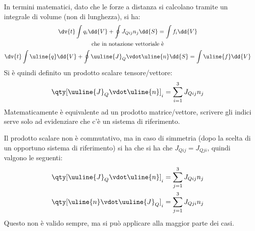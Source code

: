 In termini matematici, dato che le forze a distanza si calcolano tramite un integrale di volume (non di lunghezza), si ha:
	\begin{equation*}
		\begin{gathered}
			\dv{t} \int{q_i \dd{V}} + \oint{J_{Qij} n_j \dd{S}} = \int{f_i \dd{V}} \\
			\text{che in notazione vettoriale è} \\
			\dv{t} \int{\uline{q} \dd{V}} + \oint{\uuline{J}_Q \vdot \uline{n} \dd{S}} = \int{\uline{f} \dd{V}}
		\end{gathered}
	\end{equation*}
Si è quindi definito un prodotto scalare tensore/vettore: 
	\begin{equation*}
		{\qty[\uuline{J}_Q \vdot \uline{n}]}_i = \sum_{i = 1}^{3} {J_{Qij} n_j}
	\end{equation*}
Matematicamente è equivalente ad un prodotto matrice/vettore, scrivere gli indici serve solo ad evidenziare che c'è un sistema di riferimento.

Il prodotto scalare non è commutativo, ma in caso di simmetria (dopo la scelta di un opportuno sistema di riferimento) si ha che si ha che $J_{Qij} = J_{Qji}$, quindi valgono le seguenti:
	\begin{equation*}
		\begin{aligned}
			{\qty[\uuline{J}_Q \vdot \uline{n}]}_i = \sum_{j = 1}^{3} {J_{Qij} n_j} \\
			{\qty[\uline{n} \vdot \uuline{J}_Q]}_i = \sum_{j = 1}^{3} {J_{Qji} n_j}
		\end{aligned}
	\end{equation*}
Questo non è valido sempre, ma si può applicare alla maggior parte dei casi.
%
